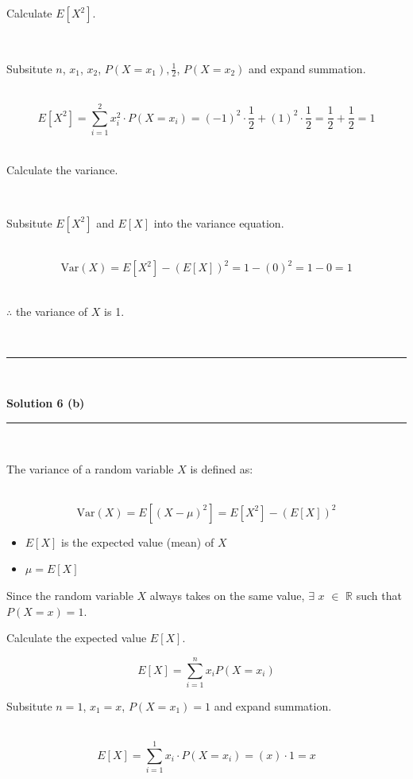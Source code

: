 \documentclass{article}
\begin{document}
\parbox{\textwidth}{Calculate $E[X^2]$.}\\

\parbox{\textwidth}{Subsitute $n$, $x_1$, $x_2$, $P(X = x_1), \frac{1}{2}$, $P(X = x_2)$ and expand summation.}\\

$$E[X^2] = \sum^2_{i=1} x_i^2 \cdot P(X = x_i) = (-1)^2 \cdot \frac{1}{2} + (1)^2 \cdot \frac{1}{2} = \frac{1}{2} + \frac{1}{2} = 1$$\\

\parbox{\textwidth}{Calculate the variance.}\\

\parbox{\textwidth}{Subsitute $E[X^2]$ and $E[X]$ into the variance equation.}\\

$$\text{Var}(X) = E[X^2] - (E[X])^2 = 1 - (0)^2 = 1 - 0 = 1$$\\

\parbox{\textwidth}{$\therefore$ the variance of $X$ is 1.}\\

\noindent\rule{\textwidth}{0.4pt}\\

\newpage

\textbf{Solution 6 (b)}

\noindent\rule{\textwidth}{0.4pt}\\

\parbox{\textwidth}{The variance of a random variable $X$ is defined as:}\\

$$\text{Var}(X) = E[(X - \mu)^2] = E[X^2] - (E[X])^2$$

\begin{itemize}
    \item $E[X]$ is the expected value (mean) of $X$
    \item $\mu = E[X]$
\end{itemize}

\parbox{\textwidth}{Since the random variable $X$ always takes on the same value, $\exists$ $x$ $\in$ $\mathbb{R}$ such that $P(X=x) =1$.}

\parbox{\textwidth}{Calculate the expected value $E[X]$.}

$$E[X] = \sum^{n}_{i=1} x_i P(X = x_i)$$

\parbox{\textwidth}{Subsitute $n=1$, $x_1=x$, $P(X = x_1) =1$ and expand summation.}\\

$$E[X] = \sum^1_{i=1} x_i \cdot P(X = x_i) = (x) \cdot 1 = x$$
\end{document}

